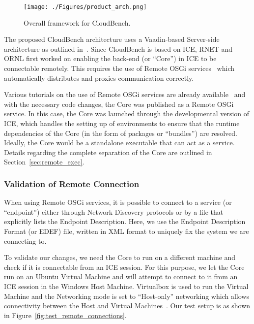 \begin{figure}[thb]
\begin{center}
\leavevmode
\texttt{[image: ./Figures/product\_arch.png]}
\end{center}
\caption{Overall framework for CloudBench.}
\label{fig:cloudbench_arch}
\end{figure}

The proposed CloudBench architecture uses a Vaadin-based Server-side 
architecture as outlined in~\cite{vaadin_client_app}. Since CloudBench is based 
on ICE, RNET and ORNL first worked on enabling the back-end (or ``Core'') in 
ICE to be connectable remotely. This requires the use of Remote OSGi 
services~\cite{osgi_ecf} which automatically distributes and proxies 
communication correctly.

Various tutorials on the use of Remote OSGi services are already 
available~\cite{rosgi_getting_started} and with the necessary code changes, the 
Core was published as a Remote OSGi service. In this case, the Core was 
launched through the developmental version of ICE, which handles the setting up 
of environments to ensure that the runtime dependencies of the Core (in the 
form of packages or ``bundles'') are resolved. Ideally, the Core would be a 
standalone executable that can act as a service. Details regarding the complete 
separation of the Core are outlined in Section~\ref{sec:remote_exec}.

\subsubsection{Validation of Remote Connection}
When using Remote OSGi services, it is possible to connect to a service (or 
``endpoint'') either through Network Discovery protocols or by a file that 
explicitly lists the Endpoint Description. Here, we use the Endpoint 
Description Format (or EDEF) file, written in XML format to uniquely fix the 
system we are connecting to.

To validate our changes, we need the Core to run on a different machine and 
check if it is connectable from an ICE session. For this purpose, we let the 
Core run on an Ubuntu Virtual Machine and will attempt to connect to it from an 
ICE session in the Windows Host Machine. Virtualbox is used to run the Virtual 
Machine and the Networking mode is set to ``Host-only'' networking which allows 
connectivity between the Host and Virtual Machines~\cite{vbox_networking}. Our 
test setup is as shown in Figure~\ref{fig:test_remote_connections}.

